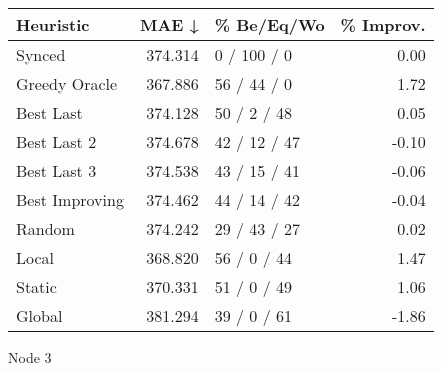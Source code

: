 \begin{tabular}{lrlr}
\toprule
\textbf{Heuristic} & \textbf{MAE ↓} & \textbf{\% Be/Eq/Wo} & \textbf{\% Improv.} \\
\midrule
            Synced &        374.314 &          0 / 100 / 0 &                0.00 \\
     Greedy Oracle &        367.886 &          56 / 44 / 0 &                1.72 \\
         Best Last &        374.128 &          50 / 2 / 48 &                0.05 \\
       Best Last 2 &        374.678 &         42 / 12 / 47 &               -0.10 \\
       Best Last 3 &        374.538 &         43 / 15 / 41 &               -0.06 \\
    Best Improving &        374.462 &         44 / 14 / 42 &               -0.04 \\
            Random &        374.242 &         29 / 43 / 27 &                0.02 \\
             Local &        368.820 &          56 / 0 / 44 &                1.47 \\
            Static &        370.331 &          51 / 0 / 49 &                1.06 \\
            Global &        381.294 &          39 / 0 / 61 &               -1.86 \\
\bottomrule
\end{tabular}
\caption{Node 3}
\label{tab:non_lr05_le1_bs2_3}
